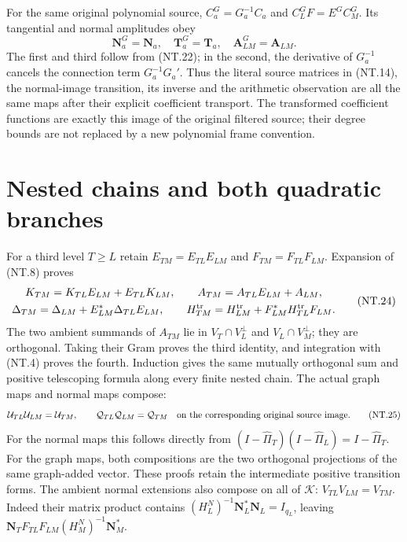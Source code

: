 \documentclass[11pt]{article}
\begin{document}
For the same original polynomial source,
$C_a^G=G_a^{-1}C_a$ and
$C_L^GF=E^GC_M^G$. Its tangential and normal amplitudes obey
\[
 \mathbf N_a^G=\mathbf N_a,\quad
 \mathbf T_a^G=\mathbf T_a,\quad
 \mathbf A_{LM}^G=\mathbf A_{LM}.
 \tag{NT.23}
\]
The first and third follow from (NT.22); in the second,
the derivative of $G_a^{-1}$ cancels the connection term
$G_a^{-1}G_a'$. Thus the literal source matrices in (NT.14),
the normal-image transition, its inverse and the arithmetic
observation are all the same maps after their explicit coefficient
transport. The transformed coefficient functions are exactly this
image of the original filtered source; their degree bounds are
not replaced by a new polynomial frame convention.

\section{Nested chains and both quadratic branches}

For a third level $T\ge L$ retain
$E_{TM}=E_{TL}E_{LM}$ and $F_{TM}=F_{TL}F_{LM}$.
Expansion of (NT.8) proves
\[
 \begin{gathered}
 K_{TM}=K_{TL}E_{LM}+E_{TL}K_{LM},\qquad
 A_{TM}=A_{TL}E_{LM}+A_{LM},\\
 \Delta_{TM}=\Delta_{LM}+E_{LM}^*\Delta_{TL}E_{LM},\qquad
 H_{TM}^{\rm tr}=H_{LM}^{\rm tr}+F_{LM}^*H_{TL}^{\rm tr}F_{LM}.
 \end{gathered}
 \tag{NT.24}
\]
The two ambient summands of $A_{TM}$ lie in
$V_T\cap V_L^\perp$ and $V_L\cap V_M^\perp$;
they are orthogonal. Taking their Gram proves the third identity,
and integration with (NT.4) proves the fourth. Induction gives
the same mutually orthogonal sum and positive telescoping formula
along every finite nested chain. The actual graph maps and normal
maps compose:
\[
 \mathcal U_{TL}\mathcal U_{LM}=\mathcal U_{TM},\qquad
 \mathcal Q_{TL}\mathcal Q_{LM}=\mathcal Q_{TM}
            \quad\hbox{on the corresponding original source image}.
 \tag{NT.25}
\]
For the normal maps this follows directly from
$(I-\widehat\Pi_T)(I-\widehat\Pi_L)=I-\widehat\Pi_T$.
For the graph maps, both compositions are the two orthogonal
projections of the same graph-added vector. These proofs retain
the intermediate positive transition forms.
The ambient normal extensions also compose on all of $\mathscr K$:
$V_{TL}V_{LM}=V_{TM}$. Indeed their matrix product contains
$(H_L^N)^{-1}\mathbf N_L^*\mathbf N_L=I_{q_L}$, leaving
$\mathbf N_TF_{TL}F_{LM}(H_M^N)^{-1}\mathbf N_M^*$.
\end{document}

